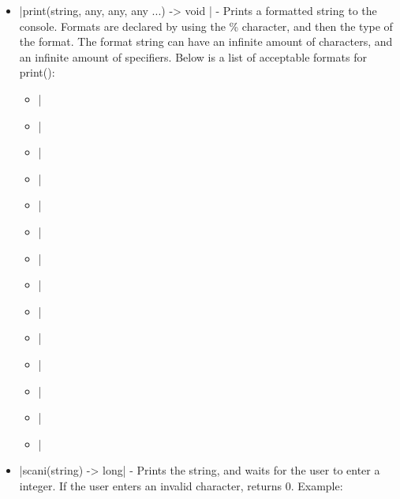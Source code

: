 \documentclass[12pt, letterpaper, oneside]{article}
\begin{document}
\begin{itemize}
		
		\begin{spverbatim}
			printString("\n"); - Prints newline to the console.
			printString("Hello World!") - Prints "Hello World!" to the console.
		\end{spverbatim}
		\newpage
		\item[--] \spverb|print(string, any, any, any ...) -> void | - Prints a formatted string to the console. Formats are declared by using the \% character, and then the type of the format. The format string can have an infinite amount of characters, and an infinite amount of specifiers. Below is a list of acceptable formats for print():
		\begin{itemize}
			\item[--] \spverb|%
			\item[--] \spverb|%
			\item[--] \spverb|%
			\item[--] \spverb|%
			\item[--] \spverb|%
			\item[--] \spverb|%
			\item[--] \spverb|%
			\item[--] \spverb|%
			\item[--] \spverb|%
			\item[--] \spverb|%
			
			
			\item[--] \spverb|%
			\item[--] \spverb|%
			\item[--] \spverb|%
			\item[--] \spverb|%
		\end{itemize}
		\newpage
		\item[--] \spverb|scani(string) -> long| - Prints the string, and waits for the user to enter a integer. If the user enters an invalid character, returns 0. Example:
		

\end{itemize}
\end{document}
